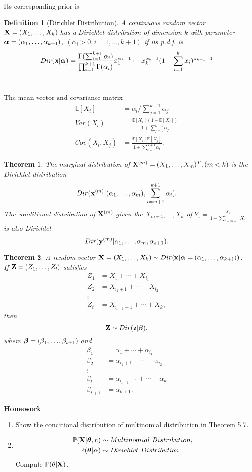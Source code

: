 \documentclass[11pt]{article}
\def\BP{{\bf P}}
\def\X{{\bf X}}
\def\x{{\bf x}}
\def\y{{\bf y}}
\def\Z{{\bf Z}}
\def\z{{\bf z}}
\def\BP{{\mathbb P}}
\def\BE{{\mathbb E}}
\def\tha{\mbox{\boldmath$\theta$\unboldmath}}
\def\aph{\mbox{\boldmath$\alpha$\unboldmath}}
\def\bt{\mbox{\boldmath$\beta$\unboldmath}}
\newtheorem{theorem}{Theorem}[section]
\newtheorem{definition}{Definition}[section]
\begin{document}
Its corresponding prior is
\begin{definition} [Dirichlet Distribution]
	A continuous random vector $\X=(X_1,\dots,X_k)$ has a Dirichlet distribution of dimension $k$ with parameter $\aph=(\alpha_1,\dots, \alpha_{k+1})$, $(\alpha_i>0, i=1,\dots,k+1)$
	if its p.d.f. is 
		\begin{equation}
			Dir(\x|\aph) = \frac{\Gamma(\sum_{i=1}^{k+1}\alpha_i)}{\prod_{i=1}^{k+1}\Gamma(\alpha_i)}x_1^{\alpha_1-1}\cdots x_k^{\alpha_k-1}(1-\sum_{i=1}^k x_i)^{\alpha_{k+1}-1}
		\end{equation}.
\end{definition}
The mean vector and covariance matrix
	\begin{align}
		\BE[X_i] &= \alpha_i/\sum_{j=1}^{k+1}\alpha_j\\
		Var(X_i) &= \frac{\BE[X_i](1-\BE[X_i])}{1+\sum_{j=1}^{k+1}\alpha_j}\\
		Cov(X_i,X_j) &= \frac{\BE[X_i]\BE[X_j]}{1+\sum_{t=1}^{k+1}\alpha_t}.
	\end{align}

\begin{theorem}
	The marginal distribution of $\X^{(m)}=(X_1,\dots,X_m)^T, (m<k)$ is the Dirichlet distribution
		$$Dir(\x^{(m)}|(\alpha_1,\dots,\alpha_m),\sum_{i=m+1}^{k+1}\alpha_i).$$
	The conditional distribution of $\X^{(m)}$ given the $X_{m+1},\dots,X_k$ of $Y_i = \frac{X_i}{1-\sum_{j=m+1}^k X_j}$ is also Dirichlet 
		$$Dir(\y^{(m)}|\alpha_1,\dots, \alpha_m,\alpha_{k+1}).$$
\end{theorem}

\begin{theorem}
	A random vector $\X=(X_1,\dots,X_k) \sim Dir(\x|\aph=(\alpha_1,\dots,\alpha_{k+1}))$. If $\Z=(Z_1,\dots,Z_t)$ satisfies 
	\begin{align}
		Z_1&=X_1+\cdots+X_{i_1}\\
		Z_2&=X_{i_1+1}+\cdots +X_{i_2}\\
		\vdots\\
		Z_t&=X_{i_{t-1}+1}+\cdots +X_k,
	\end{align}
	then 
		$$\Z \sim Dir(\z|\bt),$$
	where $\bt=(\beta_1,\dots,\beta_{t+1})$ and
		\begin{align*}
			\beta_1 &= \alpha_1+\cdots+\alpha_{i_1}\\
			\beta_2 &= \alpha_{i_1+1}+\cdots+\alpha_{i_2}\\
			\vdots\\
			\beta_t&= \alpha_{i_{t-1}+1}+\cdots +\alpha_k\\
			\beta_{t+1} &= \alpha_{k+1}.
		\end{align*}
\end{theorem}

{\bf Homework}
\begin{enumerate}
\item
Show the conditional distribution of multinomial distribution in Theorem 5.7.
\item
\begin{align*}
	\BP(\X|\tha,n)		&\sim Multinomial\ Distribution,\\
	\BP(\tha|\aph) 	&\sim Dirichlet\ Distribution.
\end{align*}
Compute $\BP(\theta|\X)$.
\end{enumerate}
\end{document}
